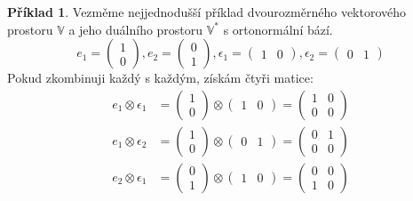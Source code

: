 \documentclass[a5paper,12pt]{amsbook}
\theoremstyle{definition}
\newtheorem{example}{Příklad}[chapter]
\newcommand{\myspace}[1]{\mathbb{#1}}
\newcommand{\mydual}[1]{\myspace{#1^{*}}}
\begin{document}
\begin{example}
Vezměme nejjednodušší příklad dvourozměrného vektorového prostoru $\myspace{V}$ a jeho duálního
prostoru $\mydual{V}$ s ortonormální bází.
\begin{equation*}
e_1 = \left(\begin{array}{c}1 \\ 0\end{array}\right),
e_2 = \left(\begin{array}{c}0 \\ 1\end{array}\right),
\epsilon_1 = \left(\begin{array}{cc}1 & 0\end{array}\right),
\epsilon_2 = \left(\begin{array}{cc}0 & 1\end{array}\right)
\end{equation*}
Pokud zkombinuji každý s každým, získám čtyři matice:
\begin{equation*}
\begin{split}
e_1 \otimes \epsilon_1 &= \left(\begin{array}{c}1 \\ 0\end{array}\right) \otimes \left(\begin{array}{cc}1 & 0\end{array}\right) =
\left(\begin{array}{cc}1 & 0 \\ 0 & 0 \end{array}\right) \\
e_1 \otimes \epsilon_2 &= \left(\begin{array}{c}1 \\ 0\end{array}\right) \otimes \left(\begin{array}{cc}0 & 1\end{array}\right) =
\left(\begin{array}{cc}0 & 1 \\ 0 & 0 \end{array}\right) \\
e_2 \otimes \epsilon_1 &= \left(\begin{array}{c}0 \\ 1\end{array}\right) \otimes \left(\begin{array}{cc}1 & 0\end{array}\right) =
\left(\begin{array}{cc}0 & 0 \\ 1 & 0 \end{array}\right) \\

\end{split}
\end{equation*}
\end{example}
\end{document}
